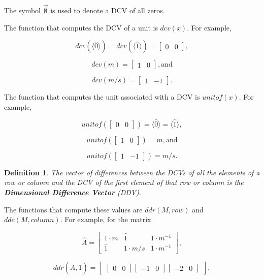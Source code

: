 \documentclass[10pt,letterpaper]{article}
\newtheorem{defn}{Definition}[section]
\numberwithin{equation}{section}
\begin{document}
The symbol $\vec{\emptyset}$ is used to denote a DCV of all zeros.

The function that computes the DCV of a unit is $dcv(x)$.  For
example,

\[ dcv(\langle\hat 0 \rangle) = dcv(\langle\hat 1 \rangle) =
\left[ \begin{matrix} 0 & 0 \end{matrix} \right] , \]

\[ dcv(m) = \left[ \begin{matrix} 1 & 0 \end{matrix} \right] , \mbox{and} \]

\[ dcv(m/s) = \left[ \begin{matrix} 1 & -1 \end{matrix} \right] . \]

The function that computes the unit associated with a DCV is
$unitof(x)$.  For example,

\[ unitof(\left[ \begin{matrix} 0 & 0 \end{matrix} \right]) =
\langle\hat 0 \rangle = \langle\hat 1 \rangle , \]

\[ unitof(\left[ \begin{matrix} 1 & 0 \end{matrix} \right]) = m, \mbox{and} \]

\[ unitof(\left[ \begin{matrix} 1 & -1 \end{matrix} \right]) = m/s. \]

\begin{defn}The vector of differences between the DCVs of all the
  elements of a row or column and the DCV of the first element of that
  row or column is the \textbf{Dimensional Difference Vector}
  (DDV).\end{defn}

The functions that compute these values are $ddr(M, row)$ and $ddc(M,
column)$.  For example, for the matrix

\[ \hat A = \left[ \begin{matrix} 
  1 \cdot m & \hat 1 & 1 \cdot m^{-1} \\
  \hat 1 & 1 \cdot m/s & 1 \cdot m^{-1}
 \end{matrix} \right] , \]

\[ ddr(\hat A, 1) = \left[ \begin{matrix} \left[ \begin{matrix} 0 &
        0 \end{matrix} \right] \left[ \begin{matrix} -1 &
        0 \end{matrix} \right] \left[ \begin{matrix} -2 &
        0 \end{matrix} \right] \end{matrix} \right] , \]
\end{document}
